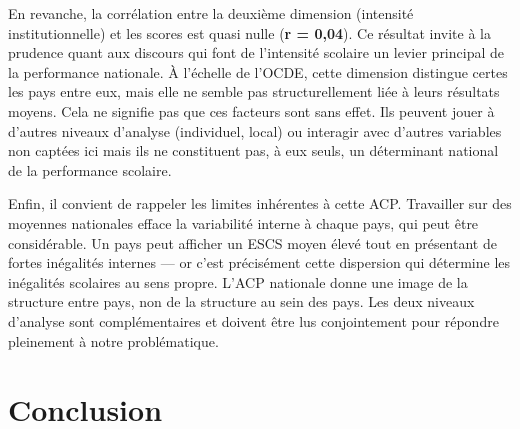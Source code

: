 \documentclass[
  french,
  11pt,
  a4paper,
]{report}
\begin{document}
En revanche, la corrélation entre la deuxième dimension (intensité
institutionnelle) et les scores est quasi nulle (\textbf{r = 0,04}). Ce
résultat invite à la prudence quant aux discours qui font de l'intensité
scolaire un levier principal de la performance nationale. À l'échelle de
l'OCDE, cette dimension distingue certes les pays entre eux, mais elle
ne semble pas structurellement liée à leurs résultats moyens. Cela ne
signifie pas que ces facteurs sont sans effet. Ils peuvent jouer à
d'autres niveaux d'analyse (individuel, local) ou interagir avec
d'autres variables non captées ici mais ils ne constituent pas, à eux
seuls, un déterminant national de la performance scolaire.

Enfin, il convient de rappeler les limites inhérentes à cette ACP.
Travailler sur des moyennes nationales efface la variabilité interne à
chaque pays, qui peut être considérable. Un pays peut afficher un ESCS
moyen élevé tout en présentant de fortes inégalités internes --- or
c'est précisément cette dispersion qui détermine les inégalités
scolaires au sens propre. L'ACP nationale donne une image de la
structure entre pays, non de la structure au sein des pays. Les deux
niveaux d'analyse sont complémentaires et doivent être lus conjointement
pour répondre pleinement à notre problématique.

\chapter{Conclusion}\label{conclusion}
\end{document}

